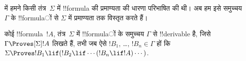 \documentclass[../../../include/open-logic-section]{subfiles}
\begin{document}


 में हमने किसी तंत्र~$\Sigma$ में !!{formula} की
प्रमाण्यता की धारणा परिभाषित की थी। अब हम इसे समुच्चय~$\Gamma$ के !!{formula}ों
से $\Sigma$ में प्रमाण्यता तक विस्तृत करते हैं।

\begin{defn}
  कोई !!{formula}~$!A$, तंत्र~$\Sigma$ में !!{formula}ों के समुच्चय $\Gamma$ से
  !!{derivable} है, जिसे $\Gamma \Proves[\Sigma] !A$ लिखते हैं, तभी जब
  ऐसे $!B_1$, \dots, $!B_n \in \Gamma$ हों कि
  $\Sigma \Proves !B_1 \lif (!B_2 \lif \cdots (!B_n \lif !A)
  \cdots)$. 
\end{defn}
\end{document}
